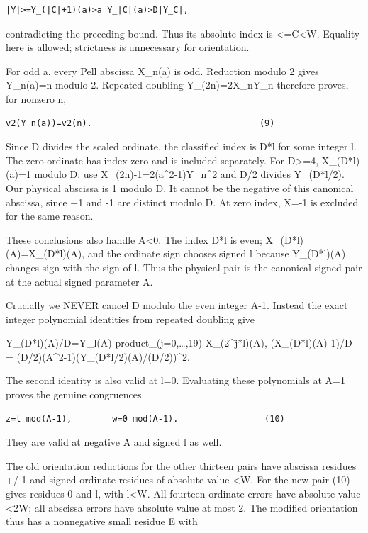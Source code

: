 \begin{verbatim}
|Y|>=Y_(|C|+1)(a)>a Y_|C|(a)>D|Y_C|,
\end{verbatim}

contradicting the preceding bound. Thus its absolute index is
\textless=\textbar C\textbar\textless W. Equality here is allowed;
strictness is unnecessary for orientation.

For odd a, every Pell abscissa X\_n(a) is odd. Reduction modulo 2 gives
Y\_n(a)=n modulo 2. Repeated doubling Y\_(2n)=2X\_nY\_n therefore
proves, for nonzero n,

\begin{verbatim}
v2(Y_n(a))=v2(n).                                 (9)
\end{verbatim}

Since D divides the scaled ordinate, the classified index is D*l for
some integer l. The zero ordinate has index zero and is included
separately. For D\textgreater=4, X\_(D*l)(a)=1 modulo D: use
X\_(2n)-1=2(a\^{}2-1)Y\_n\^{}2 and D/2 divides Y\_(D*l/2). Our physical
abscissa is 1 modulo D. It cannot be the negative of this canonical
abscissa, since +1 and -1 are distinct modulo D. At zero index, X=-1 is
excluded for the same reason.

These conclusions also handle A\textless0. The index D*l is even;
X\_(D*l)(A)=X\_(D*l)(\textbar A\textbar), and the ordinate sign chooses
signed l because Y\_(D*l)(A) changes sign with the sign of l. Thus the
physical pair is the canonical signed pair at the actual signed
parameter A.

Crucially we NEVER cancel D modulo the even integer A-1. Instead the
exact integer polynomial identities from repeated doubling give

Y\_(D*l)(A)/D=Y\_l(A) product\_(j=0,\ldots,19) X\_(2\^{}j*l)(A),
(X\_(D*l)(A)-1)/D = (D/2)(A\^{}2-1)(Y\_(D*l/2)(A)/(D/2))\^{}2.

The second identity is also valid at l=0. Evaluating these polynomials
at A=1 proves the genuine congruences

\begin{verbatim}
z=l mod(A-1),        w=0 mod(A-1).                 (10)
\end{verbatim}

They are valid at negative A and signed l as well.

The old orientation reductions for the other thirteen pairs have
abscissa residues +/-1 and signed ordinate residues of absolute value
\textless W. For the new pair (10) gives residues 0 and l, with
\textbar l\textbar\textless W. All fourteen ordinate errors have
absolute value \textless2W; all abscissa errors have absolute value at
most 2. The modified orientation thus has a nonnegative small residue E
with

